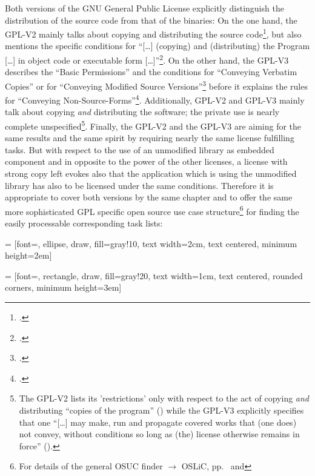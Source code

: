 Both versions of the GNU General Public License explicitly distinguish the
distribution of the source code from that of the binaries: On the one hand, the
GPL-V2 mainly talks about copying and distributing the source
code\footcite[cf.][\nopage wp.\ §1, §2]{Gpl20OsiLicense1991a}, but also mentions
the specific conditions for \enquote{[\ldots] (copying) and (distributing) the
Program [\ldots] in object code or executable form
[\ldots]}\footcite[cf.][\nopage wp.\ §3]{Gpl20OsiLicense1991a}. On the other
hand, the GPL-V3 describes the \enquote{Basic Permissions} and the conditions
for \enquote{Conveying Verbatim Copies} or for \enquote{Conveying Modified
Source Versions}\footcite[cf.][\nopage wp.\ §2, §4, §5]{Gpl30OsiLicense2007a}
before it explains the rules for \enquote{Conveying
Non-Source-Forms}\footcite[cf.][\nopage wp.\ §2, §4, §5]{Gpl30OsiLicense2007a}.
Additionally, GPL-V2 and GPL-V3 mainly talk about copying \emph{and}
distributing the software; the private use is nearly complete
unspecified\footnote{The GPL-V2 lists its 'restrictions' only with respect to
the act of copying \emph{and} distributing \enquote{copies of the program}
(\cite[cf.][\nopage wp.\ §1, §2, §4 et passim; emphasizings by
KR]{Gpl20OsiLicense1991a}) while the GPL-V3 explicitly specifies that one
\enquote{[\ldots] may make, run and propagate covered works that (one does) not
convey, without conditions so long as (the) license otherwise remains in force}
(\cite[cf.][\nopage wp.\ §2]{Gpl30OsiLicense2007a}).}. Finally, the GPL-V2 and
the GPL-V3 are aiming for the same results and the same spirit by requiring
nearly the same license fulfilling tasks.  But with respect to the use of an
unmodified library as embedded component and in opposite to the power of the
other licenses, a license with strong copy left evokes also that the application
which is using the unmodified library has also to be licensed under the same
conditions. Therefore it is appropriate to cover both versions by the same
chapter and to offer the same more sophisticated GPL specific open source use
case structure\footnote{For details of the general OSUC finder $\rightarrow$
OSLiC, pp.\ \pageref{OsucTokens} and \pageref{OsucDefinitionTree}} for finding
the easily processable corresponding task lists:
 
 = [font=\scriptsize, ellipse, draw, fill=gray!10, 
    text width=2cm, text centered, minimum height=2em]


 = [font=\tiny, rectangle, draw, fill=gray!20, 
    text width=1cm, text centered, rounded corners, minimum height=3em]

